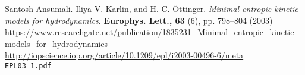\documentclass[twoside,landscape,10pt]{amsart}
\theoremstyle{plain}
\theoremstyle{definition}
\theoremstyle{remark}
\theoremstyle{remark}
\begin{document}
\begin{thebibliography}{9}
Santosh	Ansumali.  Iliya V. Karlin, and H. C. \"{O}ttinger.  \emph{Minimal entropic kinetic models for hydrodynamics}.  \textbf{Europhys. Lett., 63} (6), pp. 798–804 (2003) \\
\url{https://www.researchgate.net/publication/1835231_Minimal_entropic_kinetic_models_for_hydrodynamics}   \\
\url{http://iopscience.iop.org/article/10.1209/epl/i2003-00496-6/meta} \\
\verb|EPL03_1.pdf|










\end{thebibliography}
\end{document}
